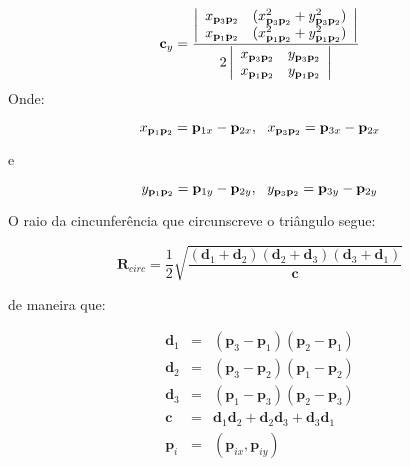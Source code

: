 \documentclass[12pt,a4paper]{book}
\begin{document}
\begin{equation}
\mathbf{c}_{y}=\frac{\left\vert 
\begin{array}{cc}
x_{\mathbf{p}_{3}\mathbf{p}_{2}} & (x_{\mathbf{p}_{3}\mathbf{p}_{2}}^{2}+y_{%
\mathbf{p}_{3}\mathbf{p}_{2}}^{2}) \\ 
x_{\mathbf{p}_{1}\mathbf{p}_{2}} & (x_{\mathbf{p}_{1}\mathbf{p}_{2}}^{2}+y_{%
\mathbf{p}_{1}\mathbf{p}_{2}}^{2})%
\end{array}%
\right\vert }{2\left\vert 
\begin{array}{cc}
x_{\mathbf{p}_{3}\mathbf{p}_{2}} & y_{\mathbf{p}_{3}\mathbf{p}_{2}} \\ 
x_{\mathbf{p}_{1}\mathbf{p}_{2}} & y_{\mathbf{p}_{1}\mathbf{p}_{2}}%
\end{array}%
\right\vert }
\end{equation}%
Onde:

\begin{equation}
x_{\mathbf{p}_{1}\mathbf{p}_{2}}=\mathbf{p}_{1x}-\mathbf{p}_{2x},\ \ x_{%
\mathbf{p}_{3}\mathbf{p}_{2}}=\mathbf{p}_{3x}-\mathbf{p}_{2x}
\end{equation}

e

\begin{equation}
y_{\mathbf{p}_{1}\mathbf{p}_{2}}=\mathbf{p}_{1y}-\mathbf{p}_{2y},\ \ y_{%
\mathbf{p}_{3}\mathbf{p}_{2}}=\mathbf{p}_{3y}-\mathbf{p}_{2y}
\end{equation}



O raio da cincunfer\^{e}ncia que circunscreve o tri\^{a}ngulo segue:



\begin{equation}
\mathbf{R}_{circ}=\frac{1}{2}\sqrt{\frac{(\mathbf{d}_{1}+\mathbf{d}_{2})(%
\mathbf{d}_{2}+\mathbf{d}_{3})(\mathbf{d}_{3}+\mathbf{d}_{1})}{\mathbf{c}}}
\end{equation}

 de maneira que:

\begin{eqnarray}
\mathbf{d}_{1} &=&(\mathbf{p}_{3}-\mathbf{p}_{1})(\mathbf{p}_{2}-\mathbf{p}%
_{1}) \\
\mathbf{d}_{2} &=&(\mathbf{p}_{3}-\mathbf{p}_{2})(\mathbf{p}_{1}-\mathbf{p}%
_{2}) \\
\mathbf{d}_{3} &=&(\mathbf{p}_{1}-\mathbf{p}_{3})(\mathbf{p}_{2}-\mathbf{p}%
_{3}) \\
\mathbf{c} &=&\mathbf{d}_{1}\mathbf{d}_{2}+\mathbf{d}_{2}\mathbf{d}_{3}+%
\mathbf{d}_{3}\mathbf{d}_{1} \\
\mathbf{p}_{i} &=&(\mathbf{p}_{ix},\mathbf{p}_{iy})
\end{eqnarray}
\end{document}
